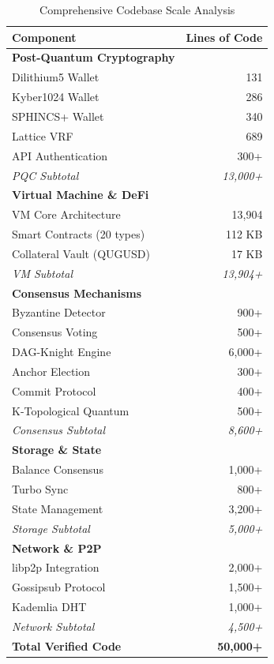 \documentclass[11pt,a4paper]{article}
\begin{document}
\begin{table}[h]
\centering
\begin{tabular}{@{}lr@{}}
\toprule
\textbf{Component} & \textbf{Lines of Code} \\ \midrule
\textbf{Post-Quantum Cryptography} & \\
\quad Dilithium5 Wallet & 131 \\
\quad Kyber1024 Wallet & 286 \\
\quad SPHINCS+ Wallet & 340 \\
\quad Lattice VRF & 689 \\
\quad API Authentication & 300+ \\
\textit{PQC Subtotal} & \textit{13,000+} \\
\midrule
\textbf{Virtual Machine \& DeFi} & \\
\quad VM Core Architecture & 13,904 \\
\quad Smart Contracts (20 types) & 112 KB \\
\quad Collateral Vault (QUGUSD) & 17 KB \\
\textit{VM Subtotal} & \textit{13,904+} \\
\midrule
\textbf{Consensus Mechanisms} & \\
\quad Byzantine Detector & 900+ \\
\quad Consensus Voting & 500+ \\
\quad DAG-Knight Engine & 6,000+ \\
\quad Anchor Election & 300+ \\
\quad Commit Protocol & 400+ \\
\quad K-Topological Quantum & 500+ \\
\textit{Consensus Subtotal} & \textit{8,600+} \\
\midrule
\textbf{Storage \& State} & \\
\quad Balance Consensus & 1,000+ \\
\quad Turbo Sync & 800+ \\
\quad State Management & 3,200+ \\
\textit{Storage Subtotal} & \textit{5,000+} \\
\midrule
\textbf{Network \& P2P} & \\
\quad libp2p Integration & 2,000+ \\
\quad Gossipsub Protocol & 1,500+ \\
\quad Kademlia DHT & 1,000+ \\
\textit{Network Subtotal} & \textit{4,500+} \\
\midrule
\textbf{Total Verified Code} & \textbf{50,000+} \\
\bottomrule
\end{tabular}
\caption{Comprehensive Codebase Scale Analysis}
\end{table}
\end{document}
